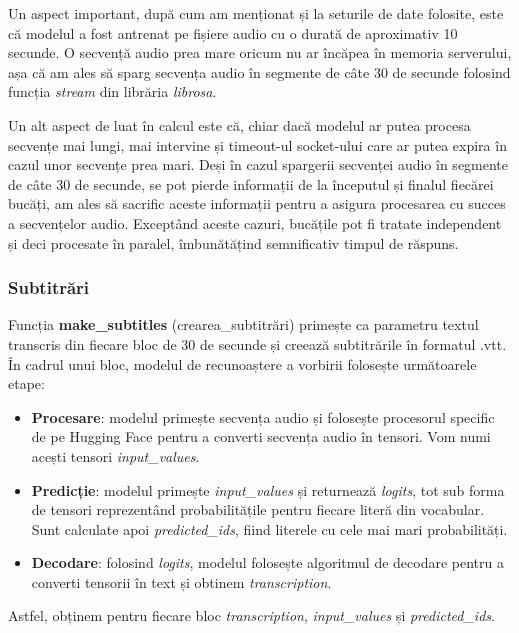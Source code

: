 \par
Un aspect important, după cum am menționat și la seturile de date folosite, este că modelul a fost
antrenat pe fișiere audio cu o durată de aproximativ 10 secunde. O secvență audio prea mare oricum
nu ar încăpea în memoria serverului, așa că am ales să sparg secvența audio în segmente de câte 30 de
secunde folosind funcția \textit{stream} din librăria \textit{librosa}.

\par
Un alt aspect de luat în calcul este că, chiar dacă modelul ar putea procesa secvențe mai lungi, mai
intervine și timeout-ul socket-ului care ar putea expira în cazul unor secvențe prea mari. Deși în
cazul spargerii secvenței audio în segmente de câte 30 de secunde, se pot pierde informații de 
la începutul și finalul fiecărei bucăți, am ales să sacrific aceste informații pentru a asigura
procesarea cu succes a secvențelor audio. Exceptând aceste cazuri, bucățile pot fi tratate independent
și deci procesate în paralel, îmbunătățind semnificativ timpul de răspuns.

\subsubsection{Subtitrări}
\label{subsec:subtitles}
\par
Funcția \textbf{make\_subtitles} (crearea\_subtitrări) primește ca parametru textul transcris din fiecare bloc de 30 de secunde
și creează subtitrările în formatul .vtt. În cadrul unui bloc, modelul de recunoaștere a vorbirii 
folosește următoarele etape:
\begin{itemize}
    \item \textbf{Procesare}: modelul primește secvența audio și folosește procesorul specific de pe
    Hugging Face pentru a converti secvența audio în tensori. Vom numi acești tensori \textit{input\_values}.
    \item \textbf{Predicție}: modelul primește \textit{input\_values} și returnează \textit{logits}, tot
    sub forma de tensori reprezentând probabilitățile pentru fiecare literă din vocabular. Sunt calculate
    apoi \textit{predicted\_ids}, fiind literele cu cele mai mari probabilități.
    \item \textbf{Decodare}: folosind \textit{logits}, modelul folosește algoritmul de decodare pentru a
    converti tensorii în text și obtinem \textit{transcription}.
\end{itemize}

Astfel, obținem pentru fiecare bloc \textit{transcription}, \textit{input\_values} și \textit{predicted\_ids}.

